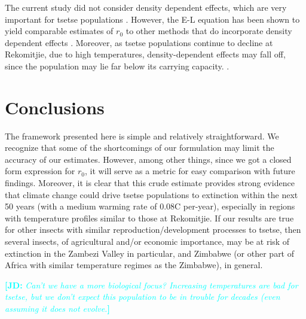 \documentclass[12pt,a4paper]{article}
\newcommand{\comment}[3]{\textcolor{#1}{\textbf{[#2: }\textsl{#3}\textbf{]}}}
\newcommand{\jd}[1]{\comment{cyan}{JD}{#1}}
\begin{document}
The current study did not consider density dependent effects, which are very important for tsetse populations \cite{Rogers1975}. However, the E-L equation has been shown to yield comparable estimates of $r_0$ to other methods that do incorporate density dependent effects \cite{Cortes2016}. Moreover, as tsetse populations continue to decline at Rekomitjie, due to high temperatures, density-dependent effects may fall off, since the population may lie far below its carrying capacity. . 


\section*{Conclusions}
The framework presented here is simple and relatively straightforward. We recognize that some of the shortcomings of our formulation may limit the accuracy of our estimates.  However, among other things, since we got a closed form expression for $r_0$, it will serve as a metric for easy comparison with future findings. Moreover, it is clear that this crude estimate provides strong evidence that climate change could drive tsetse populations to extinction within the next 50 years (with a medium warming rate of 0.08\textdegree C per-year), especially in regions with temperature profiles similar to those at Rekomitjie. If our results are true for other insects with similar reproduction/development processes to tsetse, then several insects, of agricultural and/or economic importance, may be at risk of extinction in the Zambezi Valley in particular, and Zimbabwe (or other part of Africa with similar temperature regimes as the Zimbabwe), in general. 


\jd{Can't we have a more biological focus? Increasing temperatures are bad for tsetse, but we don't expect this population to be in trouble for decades (even assuming it does not evolve.}


\nocite{*}

\end{document}
